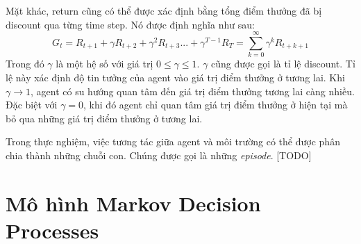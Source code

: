 	Mặt khác, return cũng có thể được xác định bằng tổng điểm thưởng đã bị discount qua từng time step. Nó được định nghĩa như sau:
	$$\mathit{G_t} = \mathit{R_{t+1}} + \gamma\mathit{R_{t+2}} + \gamma^{2}\mathit{R_{t+3}}... + \gamma^{T-1}\mathit{R_{T}} = \sum_{k=0}^{\infty}\gamma^{k}\mathit{R_{t+k+1}}$$
	Trong đó $\gamma$ là một hệ số với giá trị $0\leqslant \gamma \leqslant 1$. $\gamma$ cũng được gọi là tỉ lệ discount. Tỉ lệ này xác định độ tin tưởng của agent vào giá trị điểm thưởng ở tương lai. Khi $\gamma \to 1$, agent có su hướng quan tâm đến giá trị điểm thưởng tương lai càng nhiều. Đặc biệt với $\gamma = 0$, khi đó agent chỉ quan tâm giá trị điểm thưởng ở hiện tại mà bỏ qua những giá trị điểm thưởng ở tương lai.
	
	Trong thực nghiệm, việc tương tác giữa agent và môi trường có thể được phân chia thành những chuỗi con. Chúng được gọi là những \textit{episode}. [TODO]
	
	
\section{Mô hình Markov Decision Processes}
